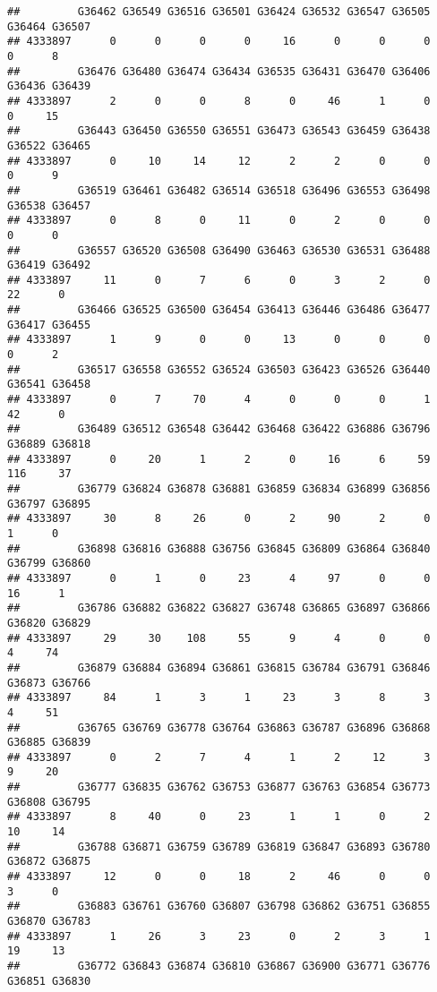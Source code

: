 \documentclass[
]{article}
\begin{document}
\begin{verbatim}
##         G36462 G36549 G36516 G36501 G36424 G36532 G36547 G36505 G36464 G36507
## 4333897      0      0      0      0     16      0      0      0      0      8
##         G36476 G36480 G36474 G36434 G36535 G36431 G36470 G36406 G36436 G36439
## 4333897      2      0      0      8      0     46      1      0      0     15
##         G36443 G36450 G36550 G36551 G36473 G36543 G36459 G36438 G36522 G36465
## 4333897      0     10     14     12      2      2      0      0      0      9
##         G36519 G36461 G36482 G36514 G36518 G36496 G36553 G36498 G36538 G36457
## 4333897      0      8      0     11      0      2      0      0      0      0
##         G36557 G36520 G36508 G36490 G36463 G36530 G36531 G36488 G36419 G36492
## 4333897     11      0      7      6      0      3      2      0     22      0
##         G36466 G36525 G36500 G36454 G36413 G36446 G36486 G36477 G36417 G36455
## 4333897      1      9      0      0     13      0      0      0      0      2
##         G36517 G36558 G36552 G36524 G36503 G36423 G36526 G36440 G36541 G36458
## 4333897      0      7     70      4      0      0      0      1     42      0
##         G36489 G36512 G36548 G36442 G36468 G36422 G36886 G36796 G36889 G36818
## 4333897      0     20      1      2      0     16      6     59    116     37
##         G36779 G36824 G36878 G36881 G36859 G36834 G36899 G36856 G36797 G36895
## 4333897     30      8     26      0      2     90      2      0      1      0
##         G36898 G36816 G36888 G36756 G36845 G36809 G36864 G36840 G36799 G36860
## 4333897      0      1      0     23      4     97      0      0     16      1
##         G36786 G36882 G36822 G36827 G36748 G36865 G36897 G36866 G36820 G36829
## 4333897     29     30    108     55      9      4      0      0      4     74
##         G36879 G36884 G36894 G36861 G36815 G36784 G36791 G36846 G36873 G36766
## 4333897     84      1      3      1     23      3      8      3      4     51
##         G36765 G36769 G36778 G36764 G36863 G36787 G36896 G36868 G36885 G36839
## 4333897      0      2      7      4      1      2     12      3      9     20
##         G36777 G36835 G36762 G36753 G36877 G36763 G36854 G36773 G36808 G36795
## 4333897      8     40      0     23      1      1      0      2     10     14
##         G36788 G36871 G36759 G36789 G36819 G36847 G36893 G36780 G36872 G36875
## 4333897     12      0      0     18      2     46      0      0      3      0
##         G36883 G36761 G36760 G36807 G36798 G36862 G36751 G36855 G36870 G36783
## 4333897      1     26      3     23      0      2      3      1     19     13
##         G36772 G36843 G36874 G36810 G36867 G36900 G36771 G36776 G36851 G36830

\end{verbatim}
\end{document}
